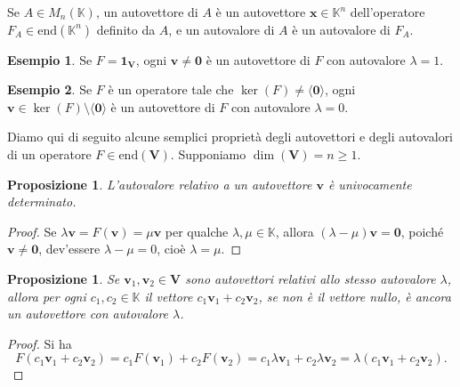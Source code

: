 \documentclass{article}
\theoremstyle{plain}
\newtheorem{prop}[thm]{Proposizione}
\theoremstyle{definition}
\newtheorem{exmp}{Esempio}[section]
\theoremstyle{remark}
\begin{document}
\vspace{10pt}

Se $A \in M_n(\mathbb{K})$, un autovettore di $A$ è un autovettore $\mathbf{x} \in \mathbb{K}^n$ dell'operatore $F_A \in\mathrm{end}(\mathbb{K}^n)$ definito da $A$, e un autovalore di $A$ è un autovalore di $F_A$.

\vspace{10pt}

\begin{exmp}
Se $F = \mathbf{1_V}$, ogni $\mathbf{v} \neq \mathbf{0}$ è un autovettore di $F$ con autovalore $\lambda = 1$.     
\end{exmp}

\vspace{10pt}

\begin{exmp}
Se $F$ è un operatore tale che $\ker(F) \neq \langle\mathbf{0}\rangle$, ogni $\mathbf{v} \in \ker(F) \setminus \langle\mathbf{0}\rangle$ è un autovettore di $F$ con autovalore $\lambda = 0$.    
\end{exmp}

\vspace{10pt}

Diamo qui di seguito alcune semplici proprietà degli autovettori e degli autovalori di un operatore $F \in \mathrm{end}(\mathbf{V})$. 
Supponiamo $\dim(\mathbf{V}) = n \geq 1$.

\vspace{10pt}

\begin{bxthm}
\begin{prop}
    L'autovalore relativo a un autovettore $\mathbf{v}$ è univocamente determinato.
\end{prop}
\end{bxthm}
\begin{proof}
    Se $\lambda \mathbf{v} = F(\mathbf{v}) = \mu \mathbf{v}$ per qualche $\lambda, \mu \in \mathbb{K}$, allora $(\lambda - \mu)\mathbf{v} = \mathbf{0}$, poiché $\mathbf{v} \neq \mathbf{0}$, dev'essere $\lambda - \mu = 0$, cioè $\lambda = \mu$.    
\end{proof}

\vspace{10pt}

\begin{bxthm}
\begin{prop}\label{trediciseii}
Se $\mathbf{v}_1, \mathbf{v}_2 \in \mathbf{V}$ sono autovettori relativi allo stesso autovalore $\lambda$, allora per ogni $c_1, c_2 \in \mathbb{K}$ il vettore 
$c_1 \mathbf{v}_1 + c_2 \mathbf{v}_2$, se non è il vettore nullo, è ancora un autovettore con autovalore $\lambda$.    
\end{prop}
\end{bxthm}
\begin{proof}
Si ha
\[
F(c_1 \mathbf{v}_1 + c_2 \mathbf{v}_2) = c_1 F(\mathbf{v}_1) + c_2 F(\mathbf{v}_2) = c_1 \lambda \mathbf{v}_1 + c_2 \lambda \mathbf{v}_2 = \lambda (c_1 \mathbf{v}_1 + c_2 \mathbf{v}_2).
\]    
\end{proof}
\end{document}
